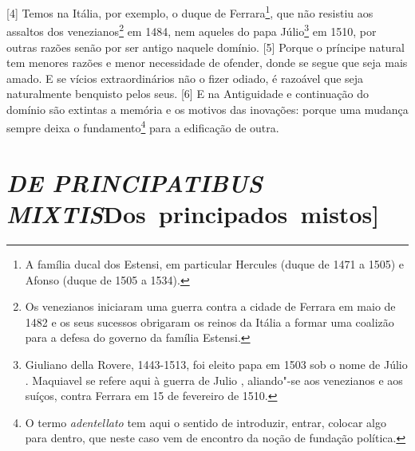 {[}4{]} Temos na Itália, por exemplo, o duque de Ferrara\footnote{A
  família ducal dos Estensi, em particular Hercules  (duque de 1471 a
  1505) e Afonso  (duque de 1505 a 1534).}, que não resistiu aos
assaltos dos venezianos\footnote{Os venezianos iniciaram uma guerra
  contra a cidade de Ferrara em maio de 1482 e os seus sucessos
  obrigaram os reinos da Itália a formar uma coalizão para a defesa do
  governo da família Estensi.} em 1484, nem aqueles do papa
Júlio\footnote{Giuliano della Rovere, 1443-1513, foi eleito papa em 1503
  sob o nome de Júlio . Maquiavel se refere aqui à guerra de Julio ,
  aliando"-se aos venezianos e aos suíços, contra Ferrara em 15 de
  fevereiro de 1510.} em 1510, por outras razões senão por ser antigo
naquele domínio. {[}5{]} Porque o príncipe natural tem menores razões e
menor necessidade de ofender, donde se segue que seja mais amado. E se
vícios extraordinários não o fizer odiado, é razoável que seja
naturalmente benquisto pelos seus. {[}6{]} E na Antiguidade e
continuação do domínio são extintas a memória e os motivos das
inovações: porque uma mudança sempre deixa o fundamento\footnote{O termo
  \emph{adentellato} tem aqui o sentido de introduzir, entrar, colocar
  algo para dentro, que neste caso vem de encontro da noção de fundação
  política.} para a edificação de outra.


\quebra\section{\emph{DE PRINCIPATIBUS MIXTIS}\break {[}Dos~principados~mistos{]}}

